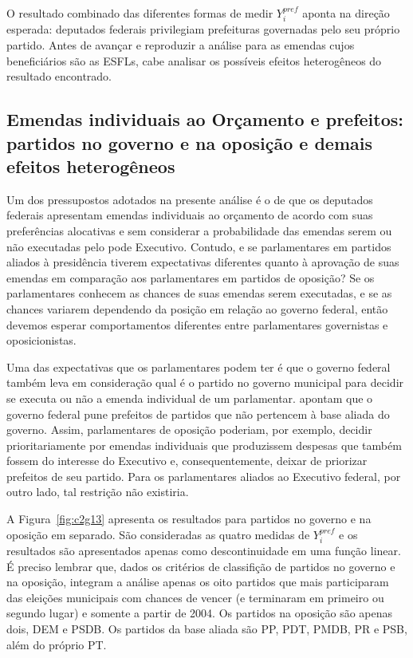 O resultado combinado das diferentes formas de medir $Y_{i}^{pref}$ aponta na direção esperada: deputados federais privilegiam prefeituras governadas pelo seu próprio partido. Antes de avançar e reproduzir a análise para as emendas cujos beneficiários são as ESFLs, cabe analisar os possíveis efeitos heterogêneos do resultado encontrado. 

\subsection{Emendas individuais ao Orçamento e prefeitos: partidos no governo e na oposição e demais efeitos heterogêneos}

Um dos pressupostos adotados na presente análise é o de que os deputados federais apresentam emendas individuais ao orçamento de acordo com suas preferências alocativas e sem considerar a probabilidade das emendas serem ou não executadas pelo pode Executivo. Contudo, e se parlamentares em partidos aliados à presidência tiverem expectativas diferentes quanto à aprovação de suas emendas em comparação aos parlamentares em partidos de oposição? Se os parlamentares conhecem as chances de suas emendas serem executadas, e se as chances variarem dependendo da posição em relação ao governo federal, então devemos esperar comportamentos diferentes entre parlamentares governistas e oposicionistas.

Uma das expectativas que os parlamentares podem ter é que o governo federal também leva em consideração qual é o partido no governo municipal para decidir se executa ou não a emenda individual de um parlamentar. \citet{Brollo2012} apontam que o governo federal pune prefeitos de partidos que não pertencem à base aliada do governo. Assim, parlamentares de oposição poderiam, por exemplo, decidir prioritariamente por emendas individuais que produzissem despesas que também fossem do interesse do Executivo e, consequentemente, deixar de priorizar prefeitos de seu partido. Para os parlamentares aliados ao Executivo federal, por outro lado, tal restrição não existiria.

A Figura~\ref{fig:c2g13} apresenta os resultados para partidos no governo e na oposição em separado. São consideradas as quatro medidas de $Y_{i}^{pref}$ e os resultados são apresentados apenas como descontinuidade em uma função linear. É preciso lembrar que, dados os critérios de classifição de partidos no governo e na oposição, integram a análise apenas os oito partidos que mais participaram das eleições municipais com chances de vencer (e terminaram em primeiro ou segundo lugar) e somente a partir de 2004. Os partidos na oposição são apenas dois, DEM e PSDB. Os partidos da base aliada são PP, PDT, PMDB, PR e PSB, além do próprio PT.

